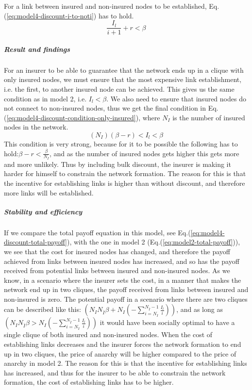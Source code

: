 For a link between insured and non-insured nodes to be established, Eq.(\ref{eq:model4-discount-i-to-noti}) has to hold.
\begin{equation}
\frac{I_{l}}{i+1}+r<\beta
\label{eq:model4-discount-i-to-noti}
\end{equation}
\subparagraph{Result and findings}
For an insurer to be able to guarantee that the network ends up in a clique with only insured nodes, we must ensure that the most expensive link establishment, i.e. the first, to another insured node can be achieved. This gives us the same condition as in model 2, i.e. $I_{l}<\beta$. 
We also need to ensure that insured nodes do not connect to non-insured nodes, thus we get the final condition in Eq. (\ref{eq:model4-discount-condition-only-insured}), where $N_{I}$ is the number of insured nodes in the network.
\begin{equation}
(N_{I})(\beta-r)<I_{l}<\beta
\label{eq:model4-discount-condition-only-insured}
\end{equation}
This condition is very strong, because for it to be possible the following has to hold:$\beta-r<\frac{\beta}{N_{I}}$, and as the number of insured nodes gets higher this gets more and more unlikely. 
Thus by including bulk discount, the insurer is making it harder for himself to constrain the network formation. The reason for this is that the incentive for establishing links is higher than without discount, and therefore more links will be established.
\subparagraph{Stability and efficiency}
If we compare the total payoff equation in this model, see Eq.(\ref{eq:model4-discount-total-payoff}), with the one in model 2 (Eq.(\ref{eq:model2-total-payoff})), we see that the cost for insured nodes has changed, and therefore the payoff achieved from links between insured nodes has increased, and so has the  payoff received from potential links between insured and non-insured nodes. 
As we know, in a scenario where the insurer sets the cost, in a manner that makes the network end up in two cliques, the payoff received from links between insured and non-insured is zero. The potential payoff in a scenario where there are two cliques can be described like this: $(N_{I}N_{\overline{I}}\beta+N_{I}(-\sum_{i=N_{I}}^{N_{\overline{I}}-1}\frac{I_{l}}{i}))$, and as long as $(N_{I}N_{\overline{I}}\beta>N_{I}(-\sum_{i=N_{I}}^{N_{\overline{I}}-1}\frac{I_{l}}{i}))$ it would have been socially optimal to have a single clique of both insured and non-insured nodes.
When the cost of establishing links decreases and the insurer forces the network formation to end up in two cliques, the price of anarchy will be higher compared to the price of anarchy in model 2. 
The reason for this is that the incentive for establishing links has increased, and thus for the insurer to be able to constrain the network formation, the cost of establishing links has to be higher.

